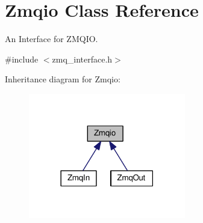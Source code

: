 \hypertarget{classZmqio}{}\section{Zmqio Class Reference}
\label{classZmqio}


An Interface for Z\+M\+Q\+IO.  




{\ttfamily \#include $<$zmq\+\_\+interface.\+h$>$}



Inheritance diagram for Zmqio\+:\nopagebreak
\begin{figure}[H]
\begin{center}
\leavevmode
\includegraphics[width=194pt]{classZmqio__inherit__graph}
\end{center}
\end{figure}
